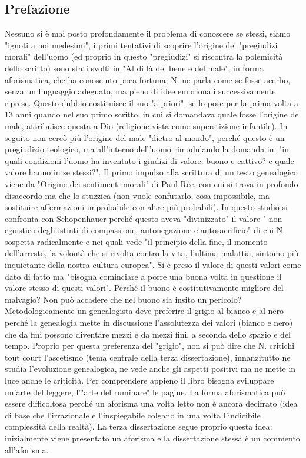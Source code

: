 \documentclass[10pt,a4paper]{article}
\begin{document}
\subsection{Prefazione}
Nessuno si è mai posto profondamente il problema di conoscere se stessi, siamo "ignoti a noi medesimi", i primi tentativi di scoprire l'origine dei "pregiudizi morali" dell'uomo (ed proprio in questo "pregiudizi" si riscontra la polemicità dello scritto) sono stati svolti in "Al di là del bene e del male", in forma aforismatica, che ha conosciuto poca fortuna; N. ne parla come se fosse acerbo, senza un linguaggio adeguato, ma pieno di idee embrionali successivamente riprese. Questo dubbio costituisce il suo "a priori", se lo pose per la prima volta a 13 anni quando nel suo primo scritto, in cui si domandava quale fosse l'origine del male, attribuisce questa a Dio (religione vista come superstizione infantile). In seguito non cercò più l'origine del male "dietro al mondo", perché questo è un pregiudizio teologico, ma all'interno dell'uomo rimodulando la domanda in: "in quali condizioni l'uomo ha inventato i giudizi di valore: buono e cattivo? e quale valore hanno in se stessi?". Il primo impulso alla scrittura di un testo genealogico viene da "Origine dei sentimenti morali" di Paul Rée, con cui si trova in profondo disaccordo ma che lo stuzzica (non vuole confutarlo, cosa impossibile, ma sostituire affermazioni improbabile con altre più probabili). In questo studio si confronta con Schopenhauer perché questo aveva "divinizzato" il valore " non egoistico degli istinti di compassione, autonegazione e autosacrificio" di cui N. sospetta radicalmente e nei quali vede "il principio della fine, il momento dell'arresto, la volontà che si rivolta contro la vita, l'ultima malattia, sintomo più inquietante della nostra cultura europea". Si è preso il valore di questi valori come dato di fatto ma "bisogna cominciare a porre una buona volta in questione il valore stesso di questi valori". Perché il buono è costitutivamente migliore del malvagio? Non può accadere che nel buono sia insito un pericolo? Metodologicamente un genealogista deve preferire il grigio al bianco e al nero perché la genealogia mette in discussione l'assolutezza dei valori (bianco e nero) che da fini possono diventare mezzi e da mezzi fini, a seconda dello spazio e del tempo. Proprio per questa preferenza del "grigio", non si può dire che N. critichi tout court l'ascetismo (tema centrale della terza dissertazione), innanzitutto ne studia l'evoluzione genealogica, ne vede anche gli aspetti positivi ma ne mette in luce anche le criticità. Per comprendere appieno il libro bisogna sviluppare un'arte del leggere, l'"arte del ruminare" le pagine. La forma aforismatica può essere difficoltosa perché un aforisma una volta letto non è ancora decifrato (idea di base che l'irrazionale e l'inspiegabile colgano in una volta l'indicibile complessità della realtà). La terza dissertazione segue proprio questa idea: inizialmente viene presentato un aforisma e la dissertazione stessa è un commento all'aforisma. 
\end{document}
